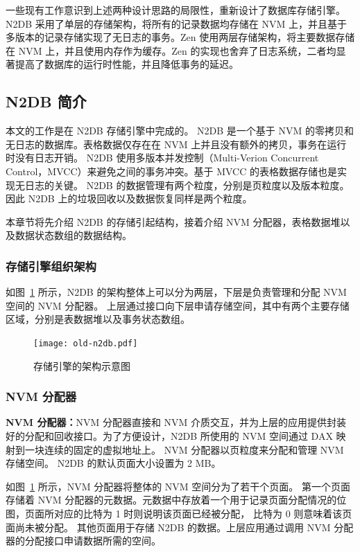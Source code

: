 一些现有工作意识到上述两种设计思路的局限性，重新设计了数据库存储引擎。N2DB 采用了单层的存储架构，将所有的记录数据均存储在 NVM 上，并且基于多版本的记录存储实现了无日志的事务\cite{liu_graduate_chinese}。Zen 使用两层存储架构，将主要数据存储在 NVM 上，并且使用内存作为缓存。Zen 的实现也舍弃了日志系统，二者均显著提高了数据库的运行时性能，并且降低事务的延迟\cite{liu_zen_2021}。

\subsection{N2DB 简介}
\label{ssec:n2db}
本文的工作是在 N2DB 存储引擎中完成的。
N2DB 是一个基于 NVM 的零拷贝和无日志的数据库。表格数据仅存在在 NVM 上并且没有额外的拷贝，事务在运行时没有日志开销。
N2DB 使用多版本并发控制（Multi-Verion Concurrent Control，MVCC）来避免之间的事务冲突。基于 MVCC 的表格数据存储也是实现无日志的关键。
N2DB 的数据管理有两个粒度，分别是页粒度以及版本粒度。
因此 N2DB 上的垃圾回收以及数据恢复同样是两个粒度。

本章节将先介绍 N2DB 的存储引起结构，接着介绍 NVM 分配器，表格数据堆以及数据状态数组的数据结构。



\subsubsection{存储引擎组织架构}

如图~\ref{fig:n2db} 所示，N2DB 的架构整体上可以分为两层，下层是负责管理和分配 NVM 空间的 NVM 分配器。
上层通过接口向下层申请存储空间，其中有两个主要存储区域，分别是表数据堆以及事务状态数组。

\begin{figure}
    \centering
    \texttt{[image: old-n2db.pdf]}
    \caption{存储引擎的架构示意图}
    \label{fig:n2db}
\end{figure}

\subsubsection{NVM 分配器}
\label{ssec:nvm-alloc}
\textbf{NVM 分配器：}NVM 分配器直接和 NVM 介质交互，并为上层的应用提供封装好的分配和回收接口。为了方便设计，N2DB 所使用的 NVM 空间通过 DAX 映射到一块连续的固定的虚拟地址上。
NVM 分配器以页粒度来分配和管理 NVM 存储空间。
N2DB 的默认页面大小设置为 2 MB。

如图~\ref{fig:n2db} 所示，NVM 分配器将整体的 NVM 空间分为了若干个页面。
第一个页面存储着 NVM 分配器的元数据。元数据中存放着一个用于记录页面分配情况的位图，页面所对应的比特为 1 时则说明该页面已经被分配，
比特为 0 则意味着该页面尚未被分配。
其他页面用于存储 N2DB 的数据。上层应用通过调用 NVM 分配器的分配接口申请数据所需的空间。


